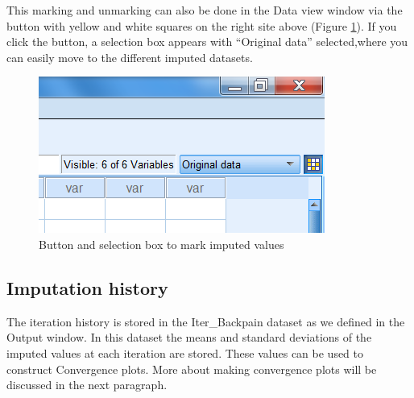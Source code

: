 \documentclass[
]{book}
\begin{document}
This marking and unmarking can also be done in the Data view window via the button with yellow and white squares on the right site above (Figure \ref{fig:fig4-11}). If you click the button, a selection box appears with ``Original data'' selected,where you can easily move to the different imputed datasets.

\begin{figure}

{\centering \includegraphics[width=0.9\linewidth]{images/fig4.11} 

}

\caption{Button and selection box to mark imputed values}\label{fig:fig4-11}
\end{figure}

\hypertarget{imputation-history}{%
\subsection{Imputation history}\label{imputation-history}}

The iteration history is stored in the Iter\_Backpain dataset as we defined in the Output window. In this dataset the means and standard deviations of the imputed values at each iteration are stored. These values can be used to construct Convergence plots. More about making convergence plots will be discussed in the next paragraph.
\end{document}
